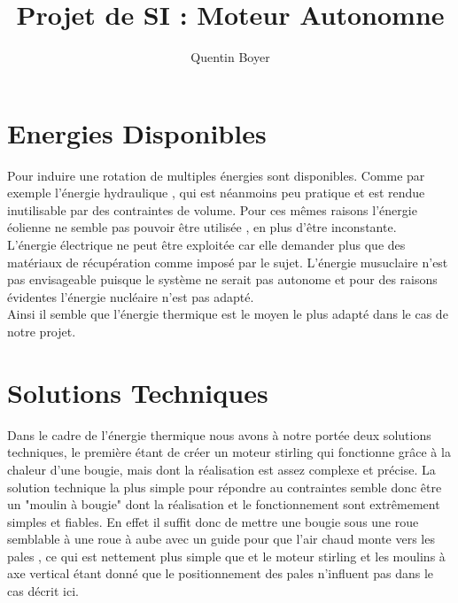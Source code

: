 \documentclass[a4paper,12pt]{article}
\title{Projet de SI : Moteur Autonomne}
\author{Quentin Boyer}
\begin{document}
\maketitle
\tableofcontents

\section{Energies Disponibles}

\indent  Pour induire une rotation de multiples énergies sont disponibles. Comme par exemple l'énergie hydraulique , qui est néanmoins peu pratique et est rendue inutilisable par des contraintes de volume. Pour ces mêmes raisons l'énergie éolienne ne semble pas pouvoir être utilisée , en plus d'être inconstante.\\[0.3cm]
\indent  L'énergie électrique ne peut être exploitée car elle demander plus que des matériaux de récupération comme imposé par le sujet. L'énergie musuclaire n'est pas envisageable puisque le système ne serait pas autonome et pour des raisons évidentes l'énergie nucléaire n'est pas adapté.\\[0.3cm]
\indent  Ainsi il semble que l'énergie thermique est le moyen le plus adapté dans le cas de notre projet.\\[0.05cm]

\pagebreak

\section{Solutions Techniques}
  Dans le cadre de l'énergie thermique nous avons à notre portée deux solutions techniques, le première étant de créer un moteur stirling qui fonctionne grâce à la chaleur d'une bougie, mais dont la réalisation est assez complexe et précise. La solution technique la plus simple pour répondre au contraintes semble donc être un "moulin à bougie" dont la réalisation et le fonctionnement sont extrêmement simples et fiables. En effet il suffit donc de mettre une bougie sous une roue semblable à une roue à aube avec un guide pour que l'air chaud monte vers les pales , ce qui est nettement plus simple que et le moteur stirling et les moulins à axe vertical étant donné que le positionnement des pales n'influent  pas dans le cas décrit ici.
\end{document}
